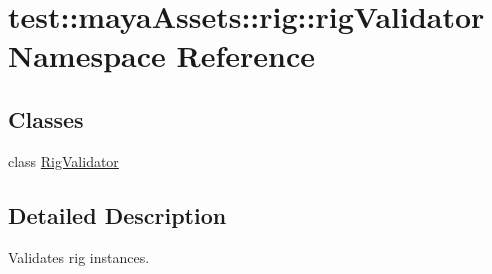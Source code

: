 \hypertarget{namespacetest_1_1mayaAssets_1_1rig_1_1rigValidator}{\section{test\-:\-:maya\-Assets\-:\-:rig\-:\-:rig\-Validator \-Namespace \-Reference}
\label{de/d65/namespacetest_1_1mayaAssets_1_1rig_1_1rigValidator}
}
\subsection*{\-Classes}
\begin{DoxyCompactItemize}
\item 
class \hyperlink{classtest_1_1mayaAssets_1_1rig_1_1rigValidator_1_1RigValidator}{\-Rig\-Validator}
\end{DoxyCompactItemize}


\subsection{\-Detailed \-Description}
\begin{DoxyVerb}
Validates rig instances.
\end{DoxyVerb}
 